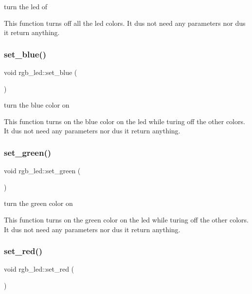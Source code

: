 turn the led of 

This function turns off all the led colors. It dus not need any parameters nor dus it return anything. \hypertarget{classrgb__led_acaebeada28c4603b975fe3e5f328cc8e}{}\label{classrgb__led_acaebeada28c4603b975fe3e5f328cc8e} 
\subsubsection{\texorpdfstring{set\+\_\+blue()}{set\_blue()}}
{\footnotesize\ttfamily void rgb\+\_\+led\+::set\+\_\+blue (\begin{DoxyParamCaption}{ }\end{DoxyParamCaption})\hspace{0.3cm}{\ttfamily [inline]}}



turn the blue color on 

This function turns on the blue color on the led while turing off the other colors. It dus not need any parameters nor dus it return anything. \hypertarget{classrgb__led_a1832619177bce8c5221e3495af1c081c}{}\label{classrgb__led_a1832619177bce8c5221e3495af1c081c} 
\subsubsection{\texorpdfstring{set\+\_\+green()}{set\_green()}}
{\footnotesize\ttfamily void rgb\+\_\+led\+::set\+\_\+green (\begin{DoxyParamCaption}{ }\end{DoxyParamCaption})\hspace{0.3cm}{\ttfamily [inline]}}



turn the green color on 

This function turns on the green color on the led while turing off the other colors. It dus not need any parameters nor dus it return anything. \hypertarget{classrgb__led_aaf7cc1181e7ddafbd199c669bd2bace1}{}\label{classrgb__led_aaf7cc1181e7ddafbd199c669bd2bace1} 
\subsubsection{\texorpdfstring{set\+\_\+red()}{set\_red()}}
{\footnotesize\ttfamily void rgb\+\_\+led\+::set\+\_\+red (\begin{DoxyParamCaption}{ }\end{DoxyParamCaption})\hspace{0.3cm}{\ttfamily [inline]}}



